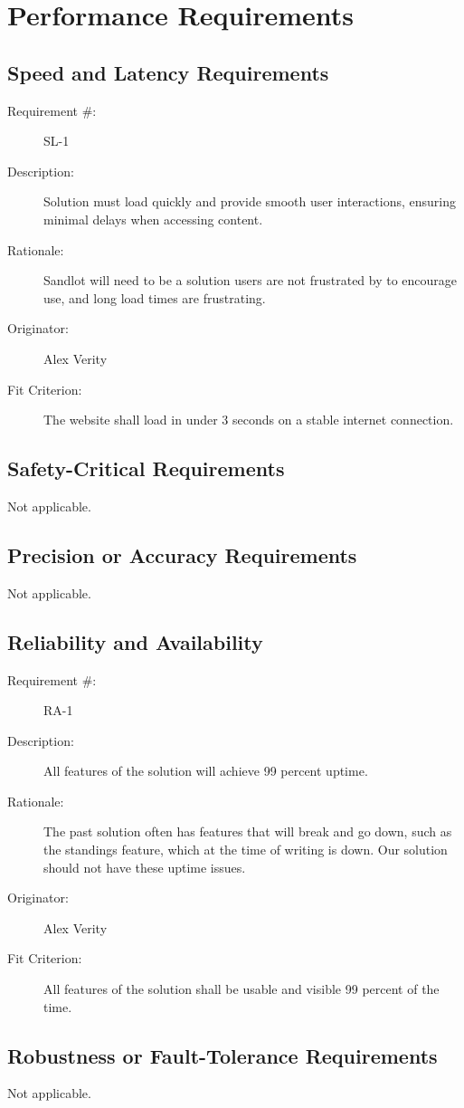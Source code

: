\documentclass[12pt]{article}
\newenvironment{myreq}[1]{%
\setlist[description]{font=\normalfont\color{darkgray}}%
\begin{tcolorbox}[colframe=black,colback=white, sharp corners, boxrule=1pt]%
\bfseries\color{blue}%
\begin{description}#1}%
{\end{description}\end{tcolorbox}}
\newcommand{\twoinline}[2]{\begin{multicols}{2}#1 #2\end{multicols}}
\newcommand{\reqno}{\item[Requirement \#:]}
\newcommand{\reqdesc}{\item[Description:]}
\newcommand{\reqrat}{\item[Rationale:]}
\newcommand{\reqorig}{\item[Originator:]}
\newcommand{\reqfit}{\item[Fit Criterion:]}
\newcommand{\reqsatis}{\item[Customer Satisfaction:]}
\newcommand{\reqdissat}{\item[Customer Dissatisfaction:]}
\begin{document}
\section{Performance Requirements}
\subsection{Speed and Latency Requirements}

\begin{myreq}
  \reqno SL-1
  \reqdesc Solution must load quickly and provide smooth user interactions,
  ensuring minimal delays when accessing content.
  \reqrat Sandlot will need to be a solution users are not frustrated by to
  encourage use, and long load times are frustrating.
  \reqorig Alex Verity
  \reqfit The website shall load in under 3 seconds on a stable internet
  connection.
  \twoinline
    {\reqsatis 2}
    {\reqdissat 5}
\end{myreq}

\subsection{Safety-Critical Requirements}
Not applicable.
\subsection{Precision or Accuracy Requirements}
Not applicable.
\subsection{Reliability and Availability}

\begin{myreq}
  \reqno RA-1
  \reqdesc All features of the solution will achieve 99 percent uptime.
  \reqrat The past solution often has features that will break and go down,
  such as the standings feature, which at the time of writing is down. Our
  solution should not have these uptime issues.
  \reqorig Alex Verity
  \reqfit All features of the solution shall be usable and visible 99 percent
  of the time.
  \twoinline
    {\reqsatis 2}
    {\reqdissat 4}
\end{myreq}

\subsection{Robustness or Fault-Tolerance Requirements}

Not applicable.
\end{document}
